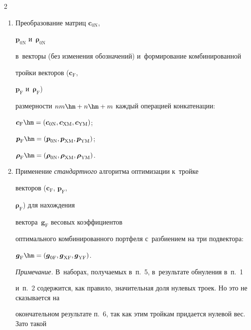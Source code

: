 \begin{multicols}{2}
\begin{enumerate}[1.]
используются во избежание деления на нуль).


  \item Преобразование матриц $\boldsymbol{c}_{\mathrm{0N}}$, 


$\boldsymbol{p}_{\mathrm{0N}}$ и~$\boldsymbol{\rho}_{\mathrm{0N}}$ 


в~векторы (без изменения обозначений) и~формирование комбинированной 


тройки векторов ($\boldsymbol{c}_{\mathrm{F}}$, 


$\boldsymbol{p}_{\mathrm{F}}$ и~$\boldsymbol{\rho}_{\mathrm{F}}$) 


размерности $nm \hm+ n \hm+ m$ каждый операцией конкатенации: 


$\boldsymbol{c}_{\mathrm{F}}\hm= (\boldsymbol{c}_{\mathrm{0N}}, 


\boldsymbol{c}_{\mathrm{XM}}, \boldsymbol{c}_{\mathrm{YM}})$; 


$\boldsymbol{p}_{\mathrm{F}}\hm = (\boldsymbol{p}_{\mathrm{0N}}, 


\boldsymbol{p}_{\mathrm{XM}}, \boldsymbol{p}_{\mathrm{YM}})$; 


$\boldsymbol{\rho}_{\mathrm{F}}\hm = (\boldsymbol{\rho}_{\mathrm{0N}}, 


\boldsymbol{\rho}_{\mathrm{XM}}, \boldsymbol{\rho}_{\mathrm{YM}})$. 


  \item Применение \textit{стандартного} алгоритма оптимизации к~тройке 


векторов ($\boldsymbol{c}_{\mathrm{F}}$, $\boldsymbol{p}_{\mathrm{F}}$, 


$\boldsymbol{\rho}_{\mathrm{F}}$) для нахождения 


вектора~$\boldsymbol{g}_{\mathrm{F}}$ весовых коэффициентов 


оптимального комбинированного портфеля с~разбиением на три подвектора: 


$\boldsymbol{g}_{\mathrm{F}}\hm= (\boldsymbol{g}_{\mathrm{0F}}, 


\boldsymbol{g}_{\mathrm{XF}}, \boldsymbol{g}_{\mathrm{YF}})$. 


  


  {\small \textit{Примечание.} В~наборах, получаемых в~п.~5, в~результате обнуления в~п.~1 


и~п.~2 содержится, как правило, значительная доля нулевых троек. Но это не сказывается на 


окончательном результате п.~6, так как этим тройкам придается нулевой вес. Зато такой 


}
\end{enumerate}
\end{multicols}
